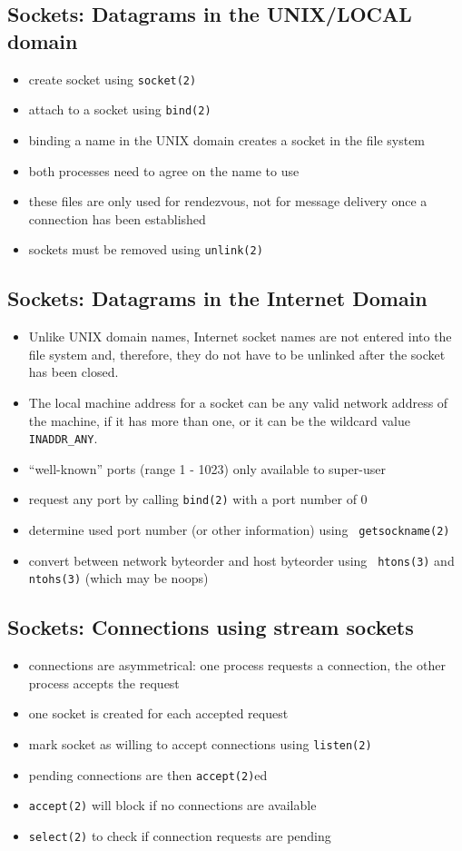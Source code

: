 \documentclass[xga]{xdvislides}
\begin{document}
\subsection{Sockets: Datagrams in the UNIX/LOCAL domain}
\begin{itemize}
	\item create socket using {\tt socket(2)}
	\item attach to a socket using {\tt bind(2)}
	\item binding a name in the UNIX domain creates a socket in the file system
	\item both processes need to agree on the name to use
	\item these files are only used for rendezvous, not for message delivery
		once a connection has been established
	\item sockets must be removed using {\tt unlink(2)}
\end{itemize}

\subsection{Sockets: Datagrams in the Internet Domain}
\begin{itemize}
	\item Unlike UNIX domain names, Internet socket names are not entered into
		the file system and, therefore, they do not have to be unlinked after the
		socket has been closed.
	\item The local machine address for a socket can be any valid network address
		of the machine, if it has more than one, or it can be the wildcard value
		{\tt INADDR\_ANY}.
	\item ``well-known'' ports (range 1 - 1023) only available to super-user
	\item request any port by calling {\tt bind(2)} with a port number of 0
	\item determine used port number (or other information) using {\tt
		getsockname(2)}
	\item convert between network byteorder and host byteorder using {\tt
		htons(3)} and {\tt ntohs(3)} (which may be noops)
\end{itemize}

\subsection{Sockets: Connections using stream sockets}
\begin{itemize}
	\item connections are asymmetrical:  one process requests a connection,
		the other process accepts the request
	\item one socket is created for each accepted request
	\item mark socket as willing to accept connections using {\tt listen(2)}
	\item pending connections are then {\tt accept(2)}ed
	\item {\tt accept(2)} will block if no connections are available
	\item {\tt select(2)} to check if connection requests are pending
\end{itemize}
\end{document}
